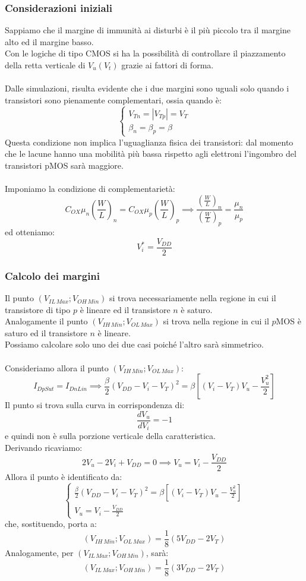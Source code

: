 \documentclass[../main.tex]{subfiles}
\begin{document}
	\subsubsection{Considerazioni iniziali}
	Sappiamo che il margine di immunità ai disturbi è il più piccolo tra il margine alto ed il margine basso.\\
	Con le logiche di tipo CMOS si ha la possibilità di controllare il piazzamento della retta verticale di $V_u(V_t)$ grazie ai fattori di forma.\\\\
	Dalle simulazioni, risulta evidente che i due margini sono uguali solo quando i transistori sono pienamente complementari, ossia quando è:
	$$\begin{cases} V_{Tn} = |V_{Tp}| = V_T \\ \beta_n = \beta_p = \beta \end{cases}$$
	Questa condizione non implica l'uguaglianza fisica dei transistori: dal momento che le lacune hanno una mobilità più bassa rispetto agli elettroni l'ingombro del transistori pMOS sarà maggiore.\\\\
	Imponiamo la condizione di complementarietà:
	$$C_{OX} \mu_n \left( \frac{W}{L} \right)_n = C_{OX} \mu_p \left( \frac{W}{L} \right)_p \implies \frac{\left( \frac{W}{L} \right)_n}{\left( \frac{W}{L} \right)_p} = \frac{\mu_n}{\mu_p}$$
	ed otteniamo:
	$$V_i^* = \frac{V_{DD}}{2}$$
	\subsubsection{Calcolo dei margini}
	Il punto $(V_{IL\,Max}; V_{OH\,Min})$ si trova necessariamente nella regione in cui il transistore di tipo $p$ è lineare ed il transistore $n$ è saturo.\\
	Analogamente il punto $(V_{IH\,Min}; V_{OL\,Max})$ si trova nella regione in cui il $p$MOS è saturo ed il transistore $n$ è lineare.\\
	Possiamo calcolare solo uno dei due casi poiché l'altro sarà simmetrico.\\\\
	Consideriamo allora il punto $(V_{IH\,Min}; V_{OL\,Max})$:
	$$I_{DpSut} = I_{DnLin} \implies \frac{\beta}{2} (V_{DD} - V_i - V_T)^2 = \beta \left[ (V_i - V_T) V_u - \frac{V_u^2}{2} \right]$$
	Il punto si trova sulla curva in corrispondenza di:
	$$\frac{dV_u}{dV_i} = -1$$
	e quindi non è sulla porzione verticale della caratteristica.\\
	Derivando ricaviamo:
	$$2V_u - 2V_i + V_{DD} = 0 \implies V_u = V_i - \frac{V_{DD}}{2}$$
	Allora il punto è identificato da:
	$$\begin{cases} \frac{\beta}{2} (V_{DD} - V_i - V_T)^2 = \beta \left[ (V_i - V_T) V_u - \frac{V_u^2}{2} \right] \\ V_u = V_i - \frac{V_{DD}}{2} \end{cases}$$
	che, sostituendo, porta a:
	$$(V_{IH\,Min}; V_{OL\,Max}) = \frac{1}{8} (5V_{DD} - 2V_T)$$
	Analogamente, per $(V_{IL\,Max}; V_{OH\,Min})$, sarà:
	$$(V_{IL\,Max}; V_{OH\,Min}) = \frac{1}{8} (3V_{DD} - 2V_T)$$
\end{document}
